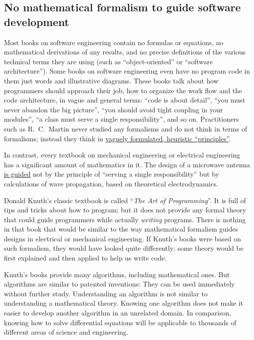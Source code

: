 \subsection{No mathematical formalism to guide software development}

Most books on software engineering contain no formulas or equations,
no mathematical derivations of any results, and no precise definitions
of the various technical terms they are using (such as ``object-oriented''
or ``software architecture''). Some books on software engineering
even have no program code in them \textendash{} just words and illustrative
diagrams. These books talk about how programmers should approach their
job, how to organize the work flow and the code architecture, in vague
and general terms: ``code is about detail'', ``you must never abandon
the big picture'', ``you should avoid tight coupling in your modules'',
``a class must serve a single responsibility'', and so on. Practitioners
such as R.\ C.\ Martin never studied any formalisms and do not think
in terms of formalisms; instead they think in \href{https://blog.cleancoder.com/uncle-bob/2016/03/19/GivingUpOnTDD.html}{vaguely formulated, heuristic \textquotedblleft principles\textquotedblright}.

In contrast, every textbook on mechanical engineering or electrical
engineering has a significant amount of mathematics in it. The design
of a microwave antenna \href{https://www.youtube.com/watch?v=46SbGxS73dY}{is guided}
not by the principle of ``serving a single responsibility'' but
by calculations of wave propagation, based on theoretical electrodynamics.

Donald Knuth's classic textbook is called ``\emph{The Art of Programming}''.
It is full of tips and tricks about how to program; but it does not
provide any formal theory that could guide programmers while actually
\emph{writing} programs. There is nothing in that book that would
be similar to the way mathematical formalism guides designs in electrical
or mechanical engineering. If Knuth's books were based on such formalism,
they would have looked quite differently: some theory would be first
explained and then applied to help us write code.

Knuth's books provide many algorithms, including mathematical ones.
But algorithms are similar to patented inventions: They can be used
immediately without further study. Understanding an algorithm is not
similar to understanding a mathematical theory. Knowing one algorithm
does not make it easier to develop another algorithm in an unrelated
domain. In comparison, knowing how to solve differential equations
will be applicable to thousands of different areas of science and
engineering.

